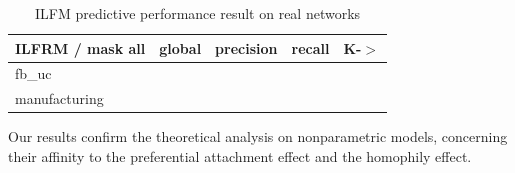  

\begin{table} \label{table:real2}
    \caption{ILFM predictive performance result on real networks}
\begin{tabular}{lrrrr}
\hline
 ILFRM / mask all   &     global &   precision &      recall &   K-\ensuremath{>} \\
\hline
fb\_uc& & & & \\
manufacturing  & & & & \\
\hline
\end{tabular}  
\end{table}

Our results confirm the theoretical analysis on nonparametric models, concerning their affinity to the preferential attachment effect and the homophily effect.



